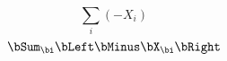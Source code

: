\documentclass{article}
\begin{document}
\[ \sum_{i} ( - X_{i} ) \]
\[ \bSum_{\bi} \bLeft \bMinus \bX_{\bi} \bRight \]
\end{document}
